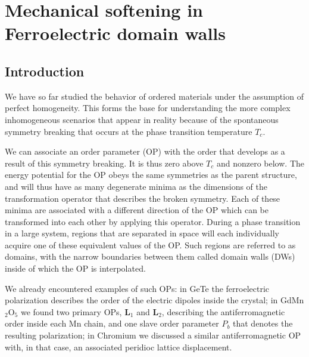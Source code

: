 \chapter{Mechanical softening in Ferroelectric domain walls \label{ch:Softening}}


\section{Introduction}
We have so far studied the behavior of ordered materials under the assumption of perfect homogeneity.
This forms the base for understanding the more complex inhomogeneous scenarios that appear in reality because of the spontaneous symmetry breaking that occurs at the phase transition temperature $T_c$.

We can associate an order parameter (OP) with the order that develops as a result of this symmetry breaking. It is thus zero above $T_c$ and nonzero below.
The energy potential for the OP obeys the same symmetries as the parent structure, and will thus have as many degenerate minima as the dimensions of the transformation operator that describes the broken symmetry.
Each of these minima are associated with a different direction of the OP which can be transformed into each other by applying this operator.
During a phase transition in a large system, regions that are separated in space will each individually acquire one of these equivalent values of the OP.
Such regions are referred to as domains, with the narrow boundaries between them called domain walls (DWs) inside of which the OP is interpolated.

We already encountered examples of such OPs: in GeTe the ferroelectric polarization describes the order of the electric dipoles inside the crystal; in GdMn$_2$O$_5$ we found two primary OPs, $\bm{L}_1$ and $\bm{L}_2$, describing the antiferromagnetic order inside each Mn chain, and one slave order parameter $P_b$ that denotes the resulting polarization; in Chromium we discussed a similar antiferromagnetic OP with, in that case, an associated peridioc lattice displacement.

